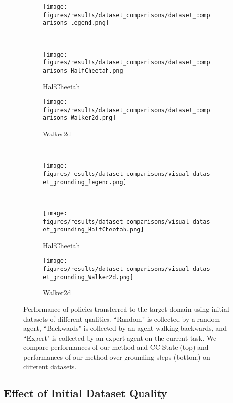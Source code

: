 \begin{figure}[t]
    \centering
    \begin{subfigure}[t]{0.6\linewidth}        
        \texttt{[image: figures/results/dataset\_comparisons/dataset\_comparisons\_legend.png]}
    \end{subfigure}
    \\
    \begin{subfigure}[t]{0.48\linewidth}
        \texttt{[image: figures/results/dataset\_comparisons/dataset\_comparisons\_HalfCheetah.png]}
        \caption{HalfCheetah}
    \end{subfigure}
    \begin{subfigure}[t]{0.48\linewidth}
        \texttt{[image: figures/results/dataset\_comparisons/dataset\_comparisons\_Walker2d.png]}
        \caption{Walker2d}
    \end{subfigure}
    \\
    \vspace{1em}
    \begin{subfigure}[t]{\linewidth}        
        \texttt{[image: figures/results/dataset\_comparisons/visual\_dataset\_grounding\_legend.png]}
    \end{subfigure}
    \\
    \begin{subfigure}[t]{0.48\linewidth}
        \texttt{[image: figures/results/dataset\_comparisons/visual\_dataset\_grounding\_HalfCheetah.png]}
        \caption{HalfCheetah}
        \label{fig:dataset_exps:halfcheetah}
    \end{subfigure}
        \begin{subfigure}[t]{0.48\linewidth}
        \texttt{[image: figures/results/dataset\_comparisons/visual\_dataset\_grounding\_Walker2d.png]}
        \caption{Walker2d}
        \label{fig:dataset_exps:walker2d}
    \end{subfigure}
    \caption{
        Performance of policies transferred to the target domain using initial datasets of different qualities.  ``Random'' is collected by a random agent, ``Backwards" is collected by an agent walking backwards, and ``Expert" is collected by an expert agent on the current task. We compare performances of our method and CC-State (top) and performances of our method over grounding steps (bottom) on different datasets.
    }
    \label{fig:dataset_exps}
\end{figure}


\subsection{Effect of Initial Dataset Quality}
\label{sec:dataset_analysis}

